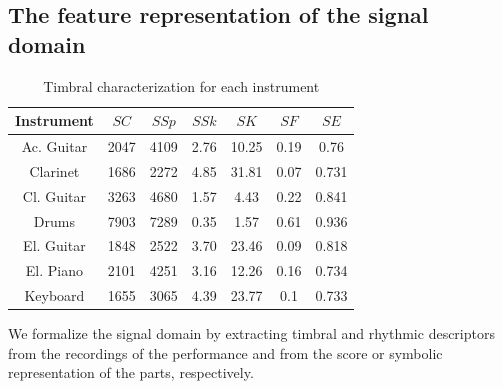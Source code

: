 

\subsection{The feature representation of the signal domain}\label{sec:NMP:domain}

\begin{table}[tb]
  \caption{Timbral characterization for each instrument}
  \centering %
  \label{tab:NMP:instruments}
  \bgroup
  \def\arraystretch{1.5}
\begin{tabular}{||c|c|c|c|c|c|c||}
 \hline
 \hline
 Instrument  & $SC$ & $SSp$ & $SSk$ & $SK$ & $SF$ & $SE$ \\
 \hline
 \hline
Ac. Guitar &   2047 & 4109 & 2.76 & 10.25 & 0.19 & 0.76 \\
Clarinet & 1686 & 2272 & 4.85 & 31.81 & 0.07 & 0.731 \\
Cl. Guitar &   3263 & 4680 & 1.57 & 4.43 & 0.22 & 0.841 \\
Drums & 7903 & 7289 & 0.35 & 1.57 & 0.61 & 0.936 \\
El. Guitar & 1848 & 2522 & 3.70 & 23.46 & 0.09 & 0.818 \\
El. Piano & 2101 & 4251 & 3.16 & 12.26 & 0.16 & 0.734 \\
Keyboard & 1655 & 3065 & 4.39 & 23.77 & 0.1 & 0.733 \\
 \hline
 \hline
   \end{tabular}
   \egroup
\end{table}

We formalize the signal domain by extracting timbral and rhythmic descriptors from the recordings of the performance and from the score or symbolic representation of the parts, respectively. 

